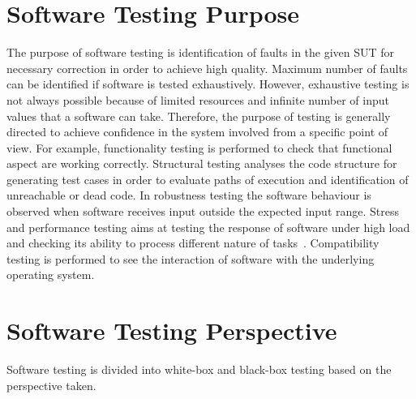 \section{Software Testing Purpose}
The purpose of software testing is identification of faults in the given SUT for necessary correction in order to achieve high quality. Maximum number of faults can be identified if software is tested exhaustively. However, exhaustive testing is not always possible because of limited resources and infinite number of input values that a software can take. Therefore, the purpose of testing is generally directed to achieve confidence in the system involved from a specific point of view. For example, functionality testing is performed to check that functional aspect are working correctly. Structural testing analyses the code structure for generating test cases in order to evaluate paths of execution and identification of unreachable or dead code. In robustness testing the software behaviour is observed when software receives input outside the expected input range. Stress and performance testing aims at testing the response of software under high load and checking its ability to process different nature of tasks~\cite{cohen2005robustness}. Compatibility testing is performed to see the interaction of software with the underlying operating system.

\section{Software Testing Perspective}
Software testing is divided into white-box and black-box testing based on the perspective taken.

